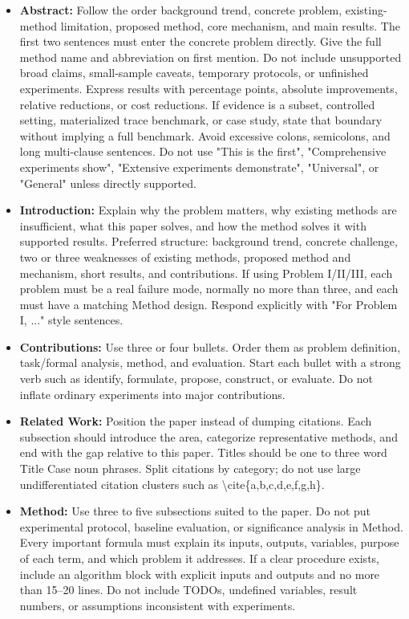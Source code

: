\begin{enumerate}
    \begin{itemize}
        \item \textbf{Abstract:} Follow the order background trend, concrete problem, existing-method limitation, proposed method, core mechanism, and main results. The first two sentences must enter the concrete problem directly. Give the full method name and abbreviation on first mention. Do not include unsupported broad claims, small-sample caveats, temporary protocols, or unfinished experiments. Express results with percentage points, absolute improvements, relative reductions, or cost reductions. If evidence is a subset, controlled setting, materialized trace benchmark, or case study, state that boundary without implying a full benchmark. Avoid excessive colons, semicolons, and long multi-clause sentences. Do not use "This is the first", "Comprehensive experiments show", "Extensive experiments demonstrate", "Universal", or "General" unless directly supported.
        \item \textbf{Introduction:} Explain why the problem matters, why existing methods are insufficient, what this paper solves, and how the method solves it with supported results. Preferred structure: background trend, concrete challenge, two or three weaknesses of existing methods, proposed method and mechanism, short results, and contributions. If using Problem I/II/III, each problem must be a real failure mode, normally no more than three, and each must have a matching Method design. Respond explicitly with "For Problem I, ..." style sentences.
        \item \textbf{Contributions:} Use three or four bullets. Order them as problem definition, task/formal analysis, method, and evaluation. Start each bullet with a strong verb such as identify, formulate, propose, construct, or evaluate. Do not inflate ordinary experiments into major contributions.
        \item \textbf{Related Work:} Position the paper instead of dumping citations. Each subsection should introduce the area, categorize representative methods, and end with the gap relative to this paper. Titles should be one to three word Title Case noun phrases. Split citations by category; do not use large undifferentiated citation clusters such as \textbackslash{}cite\{a,b,c,d,e,f,g,h\}.
        \item \textbf{Method:} Use three to five subsections suited to the paper. Do not put experimental protocol, baseline evaluation, or significance analysis in Method. Every important formula must explain its inputs, outputs, variables, purpose of each term, and which problem it addresses. If a clear procedure exists, include an algorithm block with explicit inputs and outputs and no more than 15--20 lines. Do not include TODOs, undefined variables, result numbers, or assumptions inconsistent with experiments.

\end{itemize}
\end{enumerate}
